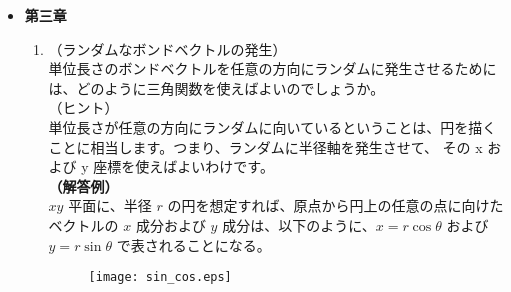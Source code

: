 \documentclass[a4paper,11pt]{ltjsarticle}
\begin{document}
\begin{itemize}
\begin{enumerate}
	{\bf（解答例）}\\
	活性化エネルギーに対応するエネルギー障壁を乗り越えて状態が遷移していく過程の頻度は、
	系中に存在する粒子の中でその障壁に対応するエネルギーを持っている粒子の存在比率を考えればよいことになる。

	本設問の場合は、基本的な回転振動数（時間の逆数）が与えられているのであるから、系が注目する状態から他の状態（今回の場合は、トランス状態からゴーシュ状態）に遷移する
	緩和時間 $\tau$ の逆数の形で書き下すことができる。
		\begin{align*}
			\dfrac{1}{\tau}
			&= 10^{12} \times \exp \left( -\dfrac{\Delta E}{k_B T} \right) \notag \\[6pt]
			&= 10^{12} \times \exp \left( -\dfrac{15 \times 10^3 {\rm J mol}^{-1} }{1.4 \times 10^{-23} {\rm J K}^{-1} \times 6.02 \times 10^{23} 
			\times 300 {\rm K} } \right) \notag \\[6pt] 
			&\simeq 10^{12} \times \exp \left( -6 \right)\notag \\[6pt]
			&= 10^{12} \times 2.5 \times 10^{-3}\notag \\[6pt]
			&\simeq 10^{9}
			\end{align*}

	したがって、オーダーでみれば、三桁程度頻度が低下するという結論を得ることができる。

	\end{enumerate}

\item
{\bf 第三章}

	\begin{enumerate}
	\item
	\label{it:3-1}
	（ランダムなボンドベクトルの発生）\\
	単位長さのボンドベクトルを任意の方向にランダムに発生させるためには、どのように三角関数を使えばよいのでしょうか。\\
	（ヒント）\\
	単位長さが任意の方向にランダムに向いているということは、円を描くことに相当します。つまり、ランダムに半径軸を発生させて、
	その x および y 座標を使えばよいわけです。\\
	{\bf（解答例）}\\
	$xy$ 平面に、半径 $r$ の円を想定すれば、原点から円上の任意の点に向けたベクトルの $x$ 成分および $y$ 成分は、以下のように、$x = r \cos \theta$ 
	および $y= r \sin \theta$ で表されることになる。
		\begin{figure}[htb]
		\centering
		\texttt{[image: sin\_cos.eps]}
		\end{figure}


\end{enumerate}
\end{itemize}
\end{document}
